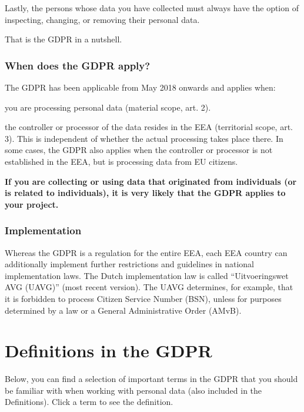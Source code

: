 \documentclass[
]{book}
\begin{document}
Lastly, the persons whose data you have collected must always have the option of inspecting,
changing, or removing their personal data.

That is the GDPR in a nutshell.

\hypertarget{when-does-the-gdpr-apply}{%
\subsubsection{When does the GDPR apply?}\label{when-does-the-gdpr-apply}}

The GDPR has been applicable from May 2018 onwards and applies when:

you are processing personal data (material scope,
art. 2).

the controller or processor of the data resides in the EEA (territorial scope,
art. 3).
This is independent of whether the actual processing takes place there. In some cases, the GDPR
also applies when the controller or processor is not established in the EEA, but is
processing data from EU citizens.

\textbf{If you are collecting or using data that originated from individuals (or is related to individuals),
it is very likely that the GDPR applies to your project.}

\hypertarget{implementation}{%
\subsubsection{Implementation}\label{implementation}}

Whereas the GDPR is a regulation for the entire EEA, each EEA country can additionally
implement further restrictions and guidelines in national implementation laws. The Dutch
implementation law is called ``Uitvoeringswet AVG (UAVG)''
(most recent version).
The UAVG determines, for example, that it is forbidden to process Citizen Service Number (BSN),
unless for purposes determined by a law or a General Administrative Order (AMvB).

\hypertarget{definitions}{%
\section*{Definitions in the GDPR}\label{definitions}}

Below, you can find a selection of important terms in the GDPR that you should be familiar with
when working with personal data (also included in the Definitions).
Click a term to see the definition.
\end{document}
